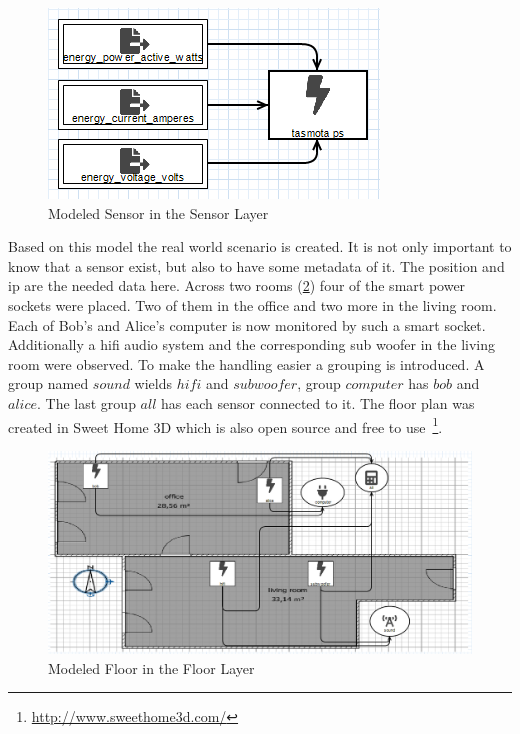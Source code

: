 \begin{figure}[!ht]
	\centering
	\includegraphics[width=.7\linewidth]{assets/images/sensorLayer}
	\caption{Modeled Sensor in the Sensor Layer}
	\label{fig:modeled_sensor_layer}
\end{figure}

Based on this model the real world scenario is created. It is not only important to know that a sensor exist, but also to have some metadata of it. The position and ip are the needed data here. Across two rooms (\cref{fig:modeled_floor_layer}) four of the smart power sockets were placed. Two of them in the office and two more in the living room. Each of Bob's and Alice's computer is now monitored by such a smart socket. Additionally a \gls{hifi} audio system and the corresponding sub woofer in the living room were observed. To make the handling easier a grouping is introduced. A group named $sound$ wields $hifi$ and $subwoofer$, group $computer$ has $bob$ and $alice$. The last group $all$ has each sensor connected to it. The floor plan was created in Sweet Home 3D which is also open source and free to use~\footnote{\url{http://www.sweethome3d.com/}}. 

\begin{figure}[!ht]
	\centering
	\includegraphics[width=\linewidth]{assets/images/floorLayer}
	\caption{Modeled Floor in the Floor Layer}
	\label{fig:modeled_floor_layer}
\end{figure}

